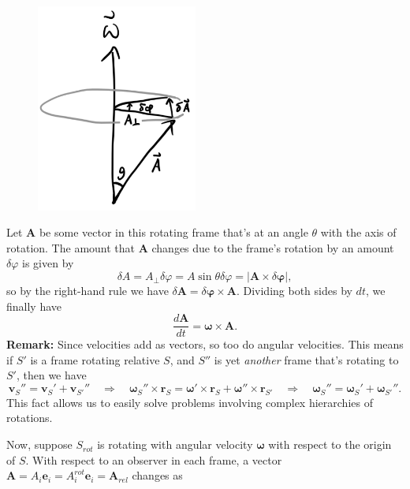 \documentclass[
  letterpaper,
  DIV=11,
  numbers=noendperiod]{scrreprt}
\begin{document}
\begin{figure}

{\centering \includegraphics[width=2.08333in,height=\textheight]{classical-mechanics/./resources/image-20230217111757574.png}

}

\end{figure}

Let \(\mathbf{A}\) be some vector in this rotating frame that's at an
angle \(\theta\) with the axis of rotation. The amount that
\(\mathbf{A}\) changes due to the frame's rotation by an amount
\(\delta\varphi\) is given by \[
\delta A = A_\perp \delta\varphi = A\sin\theta\delta\varphi = |\mathbf{A} \times \delta\boldsymbol{\varphi}|,
\] so by the right-hand rule we have
\(\delta\mathbf{A} = \delta\boldsymbol{\varphi} \times \mathbf{A}\).
Dividing both sides by \(dt\), we finally have \[
\frac{d\mathbf{A}}{dt} = \boldsymbol{\omega} \times \mathbf{A}.
\] \textbf{Remark: } Since velocities add as vectors, so too do angular
velocities. This means if \(S'\) is a frame rotating relative \(S\), and
\(S''\) is yet \emph{another} frame that's rotating to \(S'\), then we
have \[
\mathbf{v}_S'' = \mathbf{v}_S' + \mathbf{v}_{S'}'' \quad \Longrightarrow \quad  \boldsymbol{\omega}_S'' \times \mathbf{r}_S = \boldsymbol{\omega}' \times \mathbf{r}_S + \boldsymbol{\omega}'' \times \mathbf{r}_{S'} \quad \Longrightarrow \quad  \boldsymbol{\omega}_S'' = \boldsymbol{\omega}_S' + \boldsymbol{\omega}_{S'}''.
\] This fact allows us to easily solve problems involving complex
hierarchies of rotations.

Now, suppose \(S_{rot}\) is rotating with angular velocity
\(\boldsymbol{\omega}\) with respect to the origin of \(S\). With
respect to an observer in each frame, a vector
\(\mathbf{A} = A_i \mathbf{e}_i = A_i^{rot}\mathbf{e}_i = \mathbf{A}_{rel}\)
changes as
\end{document}
